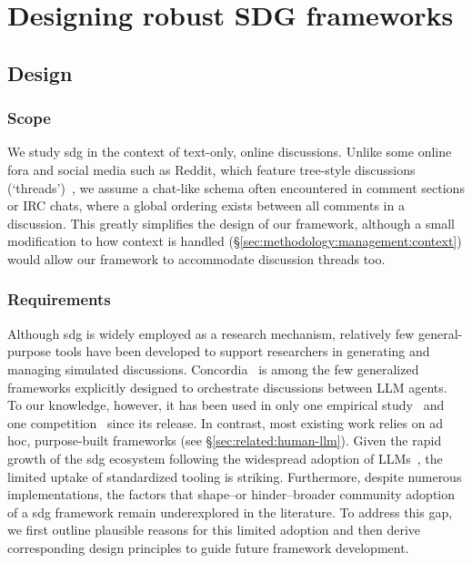 %

\section{Designing robust SDG frameworks}
\label{sec:methodology}

\subsection{Design}
\label{sec:methodology:design}

\subsubsection{Scope}
\label{sec:methodology:design:scope}

We study \ac{sdg} in the context of text-only, online discussions. Unlike some online fora and social media such as Reddit, which feature tree-style discussions (`threads')~\cite{korre2025evaluation}, we assume a chat-like schema often encountered in comment sections or IRC chats, where a global ordering exists between all comments in a discussion. This greatly simplifies the design of our framework, although a small modification to how context is handled (\S\ref{sec:methodology:management:context}) would allow 
our framework to accommodate discussion threads too.


\subsubsection{Requirements}
\label{sec:methodology:design:rules}

Although \ac{sdg} is widely employed as a research mechanism, relatively few general-purpose tools have been developed to support researchers in generating and managing simulated discussions. Concordia~\cite{concordia} is among the few generalized frameworks explicitly designed to orchestrate discussions between LLM agents. To our knowledge, however, it has been used in only one empirical study~\cite{navarro2024} and one competition~\cite{neurips_concordia} since its release. In contrast, most existing work relies on ad hoc, purpose-built frameworks (see \S\ref{sec:related:human-llm}).
Given the rapid growth of the \ac{sdg} ecosystem following the widespread adoption of LLMs~\cite{adornetto2025_gabms}, the limited uptake of standardized tooling is striking. Furthermore, despite numerous implementations, the factors that shape--or hinder--broader community adoption of a \ac{sdg} framework remain underexplored in the literature. To address this gap, we first outline plausible reasons for this limited adoption and then derive corresponding design principles to guide future framework development.

